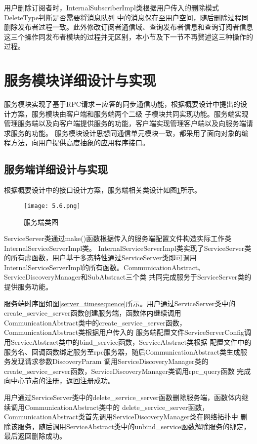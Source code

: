 用户删除订阅者时，InternalSubscriberImpl类根据用户传入的删除模式DeleteType判断是否需要将消息队列
中的消息保存至用户空间，随后删除过程同删除发布者过程一致。此外修改订阅者通信域、查询发布者信息和查询订阅者信息这三个操作同发布者模块的过程并无区别，本小节及下一节不再赘述这三种操作的过程。

\section{服务模块详细设计与实现}
服务模块实现了基于RPC请求－应答的同步通信功能，根据概要设计中提出的设计方案，服务模块由客户端和服务端两个二级
子模块共同实现功能。服务端实现管理服务端以及向客户端提供服务的功能，客户端实现管理客户端以及向服务端请求服务的功能。
服务模块设计思想同通信单元模块一致，都采用了面向对象的编程方法，向用户提供高度抽象的应用程序接口。
\subsection{服务端详细设计与实现}
根据概要设计中的接口设计方案，服务端相关类设计如图\ref{server_class}所示。
\begin{figure}[htb]
  \centering
  \texttt{[image: 5.6.png]}
  \caption{服务端类图}
  \label{server_class}
\end{figure}

ServiceServer类通过make()函数根据传入的服务端配置文件构造实际工作类InternalServiceServerImpl类。
InternalServiceServerImpl类实现了ServiceServer类的所有虚函数，用户基于多态特性通过ServiceServer类即可调用
InternalServiceServerImpl的所有函数。CommunicationAbstract、ServiceDiscoveryManager和SubAbstract三个类
共同完成服务于ServiceServer类的提供服务功能。

服务端时序图如图\ref{server_timesequence}所示。用户通过ServiceServer类中的create\_service\_server函数创建服务端，函数体内继续调用
CommunicationAbstract类中的create\_service\_server函数，CommunicationAbstract类根据用户传入的
服务端配置文件ServiceServerConfig调用ServiceAbstract类中的bind\_service函数，ServiceAbstract类根据
配置文件中的服务名、回调函数绑定服务至rpc服务器，随后CommunicationAbstract类生成服务发现请求参数DiscoveryParam
调用ServiceDiscoveryManager类的create\_service\_server函数，ServiceDiscoveryManager类调用rpc\_query函数
完成向中心节点的注册，返回注册成功。

用户通过ServiceServer类中的delete\_service\_server函数删除服务端，函数体内继续调用CommunicationAbstract类中的
delete\_service\_server函数，CommunicationAbstract类首先调用ServiceDiscoveryManager类在网络拓扑中
删除该服务，随后调用ServiceAbstract类中的unbind\_service函数解除服务的绑定，最后返回删除成功。


